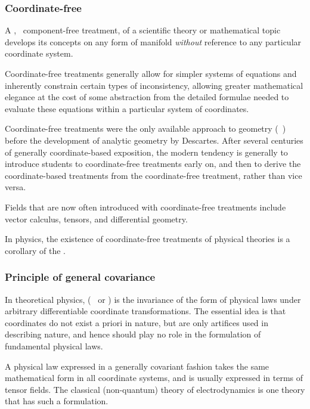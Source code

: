 \subsubsection{Coordinate-free}

A , \aka\ component-free treatment, of a scientific theory or mathematical topic develops its concepts on any form of manifold \emph{without} reference to any particular coordinate system.

Coordinate-free treatments generally allow for simpler systems of equations and inherently constrain certain types of inconsistency, allowing greater mathematical elegance at the cost of some abstraction from the detailed formulae needed to evaluate these equations within a particular system of coordinates.

Coordinate-free treatments were the only available approach to geometry (\aka\ ) before the development of analytic geometry by Descartes. After several centuries of generally coordinate-based exposition, the modern tendency is generally to introduce students to coordinate-free treatments early on, and then to derive the coordinate-based treatments from the coordinate-free treatment, rather than vice versa.

Fields that are now often introduced with coordinate-free treatments include vector calculus, tensors, and differential geometry.

In physics, the existence of coordinate-free treatments of physical theories is a corollary of the .


\subsubsection{Principle of general covariance}

In theoretical physics,  (\aka\  or ) is the invariance of the form of physical laws under arbitrary differentiable coordinate transformations. The essential idea is that coordinates do not exist a priori in nature, but are only artifices used in describing nature, and hence should play no role in the formulation of fundamental physical laws.

A physical law expressed in a generally covariant fashion takes the same mathematical form in all coordinate systems, and is usually expressed in terms of tensor fields. The classical (non-quantum) theory of electrodynamics is one theory that has such a formulation.


